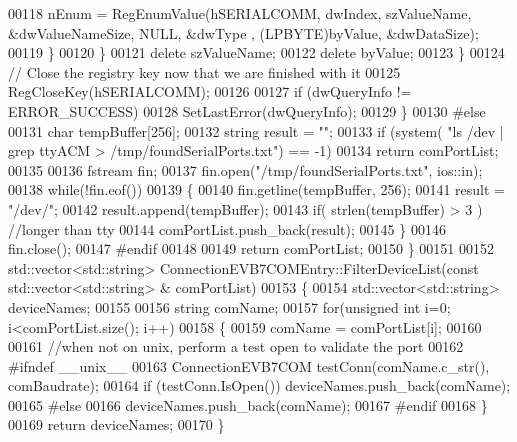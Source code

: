 \begin{DoxyCode}
00118                     nEnum = RegEnumValue(hSERIALCOMM, dwIndex, szValueName, &dwValueNameSize, NULL, &dwType
      , (LPBYTE)byValue, &dwDataSize);
00119                 \}
00120             \}
00121             \textcolor{keyword}{delete} szValueName;
00122             \textcolor{keyword}{delete} byValue;
00123         \}
00124         \textcolor{comment}{// Close the registry key now that we are finished with it}
00125         RegCloseKey(hSERIALCOMM);
00126 
00127         \textcolor{keywordflow}{if} (dwQueryInfo != ERROR\_SUCCESS)
00128             SetLastError(dwQueryInfo);
00129     \}
00130 \textcolor{preprocessor}{#else}
00131     \textcolor{keywordtype}{char} tempBuffer[256];
00132     \textcolor{keywordtype}{string} result = \textcolor{stringliteral}{""};
00133     \textcolor{keywordflow}{if} (system( \textcolor{stringliteral}{"ls /dev | grep ttyACM > /tmp/foundSerialPorts.txt"}) == -1)
00134         \textcolor{keywordflow}{return} comPortList;
00135 
00136     fstream fin;
00137     fin.open(\textcolor{stringliteral}{"/tmp/foundSerialPorts.txt"}, ios::in);
00138     \textcolor{keywordflow}{while}(!fin.eof())
00139     \{
00140         fin.getline(tempBuffer, 256);
00141         result = \textcolor{stringliteral}{"/dev/"};
00142         result.append(tempBuffer);
00143         \textcolor{keywordflow}{if}( strlen(tempBuffer) > 3 ) \textcolor{comment}{//longer than tty}
00144             comPortList.push\_back(result);
00145     \}
00146     fin.close();
00147 \textcolor{preprocessor}{#endif}
00148 
00149     \textcolor{keywordflow}{return} comPortList;
00150 \}
00151 
00152 std::vector<std::string> ConnectionEVB7COMEntry::FilterDeviceList(\textcolor{keyword}{const} std::vector<std::string> &
      comPortList)
00153 \{
00154     std::vector<std::string> deviceNames;
00155 
00156     \textcolor{keywordtype}{string} comName;
00157     \textcolor{keywordflow}{for}(\textcolor{keywordtype}{unsigned} \textcolor{keywordtype}{int} i=0; i<comPortList.size(); i++)
00158     \{
00159         comName = comPortList[i];
00160 
00161         \textcolor{comment}{//when not on unix, perform a test open to validate the port}
00162 \textcolor{preprocessor}{#ifndef \_\_unix\_\_}
00163         ConnectionEVB7COM testConn(comName.c\_str(), comBaudrate);
00164         \textcolor{keywordflow}{if} (testConn.IsOpen()) deviceNames.push\_back(comName);
00165 \textcolor{preprocessor}{#else}
00166         deviceNames.push\_back(comName);
00167 \textcolor{preprocessor}{#endif}
00168     \}
00169     \textcolor{keywordflow}{return} deviceNames;
00170 \}
\end{DoxyCode}
